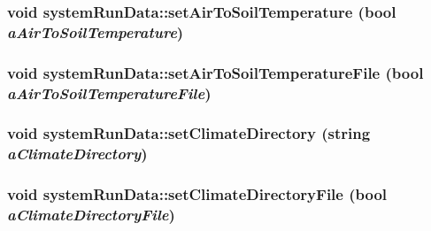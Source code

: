 \label{classsystem_run_data_ac2045bdaf6c3c39051dc78a1f0ca08af}
\hypertarget{classsystem_run_data_a081c5ffbee752c4bd22ff6cbc62b8d28}{
\subsubsection[{setAirToSoilTemperature}]{\setlength{\rightskip}{0pt plus 5cm}void systemRunData::setAirToSoilTemperature (bool {\em aAirToSoilTemperature})}}
\label{classsystem_run_data_a081c5ffbee752c4bd22ff6cbc62b8d28}
\hypertarget{classsystem_run_data_a298a875d135aa5013aee7008e1bf38f0}{
\subsubsection[{setAirToSoilTemperatureFile}]{\setlength{\rightskip}{0pt plus 5cm}void systemRunData::setAirToSoilTemperatureFile (bool {\em aAirToSoilTemperatureFile})}}
\label{classsystem_run_data_a298a875d135aa5013aee7008e1bf38f0}
\hypertarget{classsystem_run_data_af7e93d6c11b076c99119797eb4559d3e}{
\subsubsection[{setClimateDirectory}]{\setlength{\rightskip}{0pt plus 5cm}void systemRunData::setClimateDirectory (string {\em aClimateDirectory})}}
\label{classsystem_run_data_af7e93d6c11b076c99119797eb4559d3e}
\hypertarget{classsystem_run_data_ae47063135ee24308da4bed987c61346b}{
\subsubsection[{setClimateDirectoryFile}]{\setlength{\rightskip}{0pt plus 5cm}void systemRunData::setClimateDirectoryFile (bool {\em aClimateDirectoryFile})}}
